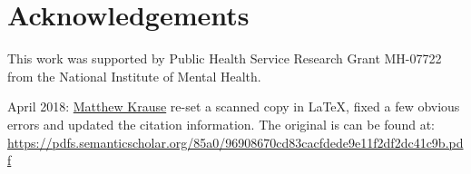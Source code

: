 \documentclass{paper}
\begin{document}
\printbibliography


\section*{Acknowledgements}
This work was supported by Public Health Service Research Grant MH-07722 from the National Institute of Mental Health.

\noindent April 2018: \href{mailto:mrkrause@gmail.com>}{Matthew Krause}  re-set a scanned copy in \LaTeX, fixed a few obvious errors and updated the citation information. The original is can be found at:\\  \url{https://pdfs.semanticscholar.org/85a0/96908670cd83cacfdede9e11f2df2dc41c9b.pdf}
\end{document}
